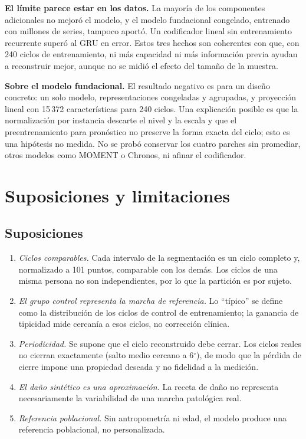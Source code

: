 \documentclass[11pt,a4paper]{amsart}
\newcommand{\gr}{$^{\circ}$}
\begin{document}
\textbf{El límite parece estar en los datos.} La mayoría de los componentes adicionales no mejoró el modelo, y el modelo fundacional congelado, entrenado con millones de series, tampoco aportó. Un codificador lineal sin entrenamiento recurrente superó al GRU en error. Estos tres hechos son coherentes con que, con 240 ciclos de entrenamiento, ni más capacidad ni más información previa ayudan a reconstruir mejor, aunque no se midió el efecto del tamaño de la muestra.

\textbf{Sobre el modelo fundacional.} El resultado negativo es para un diseño concreto: un solo modelo, representaciones congeladas y agrupadas, y proyección lineal con 15\,372 características para 240 ciclos. Una explicación posible es que la normalización por instancia descarte el nivel y la escala y que el preentrenamiento para pronóstico no preserve la forma exacta del ciclo; esto es una hipótesis no medida. No se probó conservar los cuatro parches sin promediar, otros modelos como MOMENT o Chronos, ni afinar el codificador.

\section{Suposiciones y limitaciones}
\label{sec:limites}

\subsection{Suposiciones}

\begin{enumerate}
\item \textit{Ciclos comparables.} Cada intervalo de la segmentación es un ciclo completo y, normalizado a 101 puntos, comparable con los demás. Los ciclos de una misma persona no son independientes, por lo que la partición es por sujeto.
\item \textit{El grupo control representa la marcha de referencia.} Lo ``típico'' se define como la distribución de los ciclos de control de entrenamiento; la ganancia de tipicidad mide cercanía a esos ciclos, no corrección clínica.
\item \textit{Periodicidad.} Se supone que el ciclo reconstruido debe cerrar. Los ciclos reales no cierran exactamente (salto medio cercano a 6\gr), de modo que la pérdida de cierre impone una propiedad deseada y no fidelidad a la medición.
\item \textit{El daño sintético es una aproximación.} La receta de daño no representa necesariamente la variabilidad de una marcha patológica real.
\item \textit{Referencia poblacional.} Sin antropometría ni edad, el modelo produce una referencia poblacional, no personalizada.
\end{enumerate}
\end{document}
